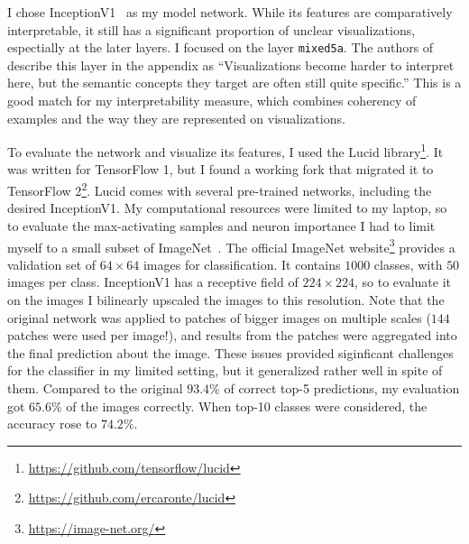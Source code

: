 \documentclass[12pt]{article}
\begin{document}
I chose InceptionV1~\cite{szegedy2015going} as my model network. While its features are comparatively interpretable, it still has a significant proportion of unclear visualizations, espectially at the later layers. I focused on the layer \texttt{mixed5a}. The authors of~\cite{olah2017feature} describe this layer in the appendix as ``Visualizations become harder to interpret here, but the semantic concepts they target are often still quite specific.'' This is a good match for my interpretability measure, which combines coherency of examples and the way they are represented on visualizations.

To evaluate the network and visualize its features, I used the Lucid library\footnote{\url{https://github.com/tensorflow/lucid}}. It was written for TensorFlow 1, but I found a working fork that migrated it to TensorFlow 2\footnote{\url{https://github.com/ercaronte/lucid}}. Lucid comes with several pre-trained networks, including the desired InceptionV1. My computational resources were limited to my laptop, so to evaluate the max-activating samples and neuron importance I had to limit myself to a small subset of ImageNet~\cite{deng2009imagenet}. The official ImageNet website\footnote{\url{https://image-net.org/}} provides a validation set of $64\times 64$ images for classification. It contains $1000$ classes, with $50$ images per class. InceptionV1 has a receptive field of $224\times 224$, so to evaluate it on the images I bilinearly upscaled the images to this resolution. Note that the original network was applied to patches of bigger images on multiple scales ($144$ patches were used per image!), and results from the patches were aggregated into the final prediction about the image. These issues provided siginficant challenges for the classifier in my limited setting, but it generalized rather well in spite of them. Compared to the original $93.4\%$ of correct top-5 predictions, my evaluation got $65.6\%$ of the images correctly. When top-10 classes were considered, the accuracy rose to $74.2\%$.
\end{document}
